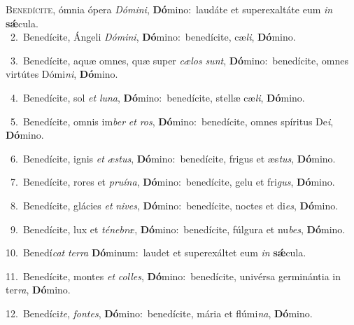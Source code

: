 \lettrine{\initial\textcolor{\initialcolor}{B}}{enedícite,} ómnia ópera \textit{Dó}\-\textit{mi}\textit{ni}, \textbf{Dó}\-mino:~\star laudáte et superexaltáte eum \textit{in} \textbf{sǽ}\-cula.\\
{\numbfont\textcolor{\numbcolor}{~2.}}~Benedícite, Ángeli \textit{Dó}\-\textit{mi}\textit{ni}, \textbf{Dó}\-mino:~\star benedícite, cæ\-\textit{li}\-, \textbf{Dó}\-mino.\par
{\numbfont\textcolor{\numbcolor}{~3.}}~Benedícite, aquæ omnes, quæ super \textit{cæ}\-\textit{los} \textit{sunt}\-, \textbf{Dó}\-mino:~\star benedícite, omnes virtútes Dómi\-\textit{ni}\-, \textbf{Dó}\-mino.\par
{\numbfont\textcolor{\numbcolor}{~4.}}~Benedícite, sol \textit{et} \textit{lu}\-\textit{na}, \textbf{Dó}\-mino:~\star benedícite, stellæ cæ\-\textit{li}\-, \textbf{Dó}\-mino.\par
{\numbfont\textcolor{\numbcolor}{~5.}}~Benedícite, omnis im\textit{ber} \textit{et} \textit{ros}\-, \textbf{Dó}\-mino:~\star benedícite, omnes spíritus De\-\textit{i}\-, \textbf{Dó}\-mino.\par
{\numbfont\textcolor{\numbcolor}{~6.}}~Benedícite, ignis \textit{et} \textit{æs}\-\textit{tus}, \textbf{Dó}\-mino:~\star benedícite, frigus et æs\-\textit{tus}\-, \textbf{Dó}\-mino.\par
{\numbfont\textcolor{\numbcolor}{~7.}}~Benedícite, rores et \textit{pru}\-\textit{í}\textit{na}, \textbf{Dó}\-mino:~\star benedícite, gelu et fri\-\textit{gus}\-, \textbf{Dó}\-mino.\par
{\numbfont\textcolor{\numbcolor}{~8.}}~Benedícite, glácies \textit{et} \textit{ni}\-\textit{ves}, \textbf{Dó}\-mino:~\star benedícite, noctes et di\-\textit{es}\-, \textbf{Dó}\-mino.\par
{\numbfont\textcolor{\numbcolor}{~9.}}~Benedícite, lux et \textit{té}\-\textit{ne}\textit{bræ}, \textbf{Dó}\-mino:~\star benedícite, fúlgura et nu\-\textit{bes}\-, \textbf{Dó}\-mino.\par
{\numbfont\textcolor{\numbcolor}{10.}}~Benedí\textit{cat} \textit{ter}\-\textit{ra} \textbf{Dó}\-minum:~\star laudet et superexáltet eum \textit{in} \textbf{sǽ}\-cula.\par
{\numbfont\textcolor{\numbcolor}{11.}}~Benedícite, montes \textit{et} \textit{col}\-\textit{les}, \textbf{Dó}\-mino:~\star benedícite, univérsa germinántia in ter\-\textit{ra}\-, \textbf{Dó}\-mino.\par
{\numbfont\textcolor{\numbcolor}{12.}}~Benedíci\-\textit{te}\-, \textit{fon}\-\textit{tes}, \textbf{Dó}\-mino:~\star benedícite, mária et flúmi\-\textit{na}\-, \textbf{Dó}\-mino.\par
